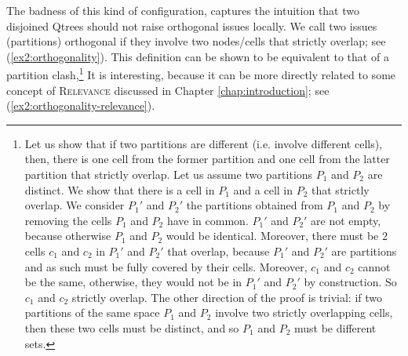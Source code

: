 The badness of this kind of configuration, captures the intuition that two disjoined Qtrees should not raise orthogonal issues locally. We call two issues (partitions) orthogonal if they involve two nodes/cells that strictly overlap; see (\ref{ex2:orthogonality}). This definition can be shown to be equivalent to that of a partition clash,\footnote{Let us show that if two partitions are different (i.e. involve different cells), then, there is one cell from the former partition and one cell from the latter partition that strictly overlap. Let us assume two partitions $P_1$ and $P_2$ are distinct. We show that there is a cell in $P_1$ and a cell in $P_2$ that strictly overlap. We consider $P_1'$ and $P_2'$ the partitions obtained from  $P_1$ and $P_2$ by removing the cells $P_1$ and $P_2$ have in common. $P_1'$ and $P_2'$ are not empty, because otherwise $P_1$ and $P_2$ would be identical. Moreover, there must be $2$ cells $c_1$ and $c_2$ in $P_1'$ and $P_2'$ that overlap, because $P_1'$ and $P_2'$ are partitions and as such must be fully covered by their cells. Moreover, $c_1$ and $c_2$ cannot be the same, otherwise, they would not be in $P_1'$ and $P_2'$ by construction. So $c_1$ and $c_2$ strictly overlap. The other direction of the proof is trivial: if two partitions of the same space $P_1$ and $P_2$ involve two strictly overlapping cells, then these two cells must be distinct, and so $P_1$ and $P_2$ must be different sets.} It is interesting, because it can be more directly related to some concept of \textsc{Relevance} discussed in Chapter \ref{chap:introduction}; see (\ref{ex2:orthogonality-relevance}).

\begin{exe}
	\label{ex2:orthogonality}
	\label{ex2:orthogonality-relevance}
\end{exe}

